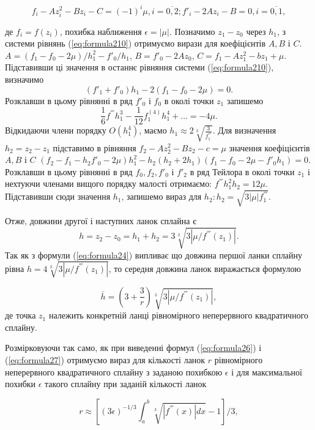 \documentclass[ukrainian,14pt]{extarticle}
\begin{document}
\begin{equation}\label{eq:formula210}
    f_i - Az^2_i - Bz_i - C = (-1)^i \mu, i = \overline{0,2}; f'_i - 2Az_i - B = 0, i = \overline{0, 1},
\end{equation}

де $f_i = f(z_i)$, похибка наближення $\epsilon = |\mu|$. Позначимо $z_1 - z_0$ через $h_1$, з системи рівнянь (\ref{eq:formula210}) отримуємо вирази для коефіцієнтів $A, B$ і $C$. $A = (f_1 - f_0 - 2\mu) / h_1^2 - f'_0 / h_1$, $B=f'_0 - 2Az_0$, $C = f_1 - Az_1^2 - bz_1 + \mu$. Підставивши ці значення в останнє рівняння системи (\ref{eq:formula210}), визначимо
$$(f'_1 + f'_0) h_1 - 2(f_1 - f_0 -2\mu) = 0.$$
Розклавши в цьому рівнянні в ряд $f'_0$ і $f_0$ в околі точки $z_1$ запишемо
$$\frac{1}{6}f^{'''}h^3_1 - \frac{1}{12} f_1^{(4)}h_1^4 + \ldots = -4\mu.$$
Відкидаючи члени порядку $O(h_1^4)$, маємо $h_1 \approx 2 \sqrt[3]{\frac{3}{f^{'''}_1}}$. Для визначення $h_2 = z_2 - z_1$ підставимо в рівняння $f_2 - Az_2^2 - Bz_2 - c = \mu$ значення коефіцієнтів $A, B$ і $C$
$(f_2 - f_1 - h_2 f'_0 - 2\mu) h_1^2 - h_2(h_2 + 2h_1)(f_1 - f_0 - 2\mu - f'_0h_1) = 0.$
Розклавши в цьому рівнянні в ряд $f_0, f_2, f'_0$ і $f'_2$ в ряд Тейлора в околі точки $z_1$ і нехтуючи членами вищого порядку малості отримаємо: $f^{'''}h^2_1 h_2 = 12\mu$. Підставивши сюди значення $h_1$, запишемо вираз для $h_2: h_2 = \sqrt{3 |\mu| f^{'''}_1}$.

Отже, довжини другої і наступних ланок сплайна є
$$h = z_2 - z_0 = h_1 + h_2 = 3 \sqrt[3]{3 |\mu / f^{'''}(z_1)|}.$$ Так як з формули (\ref{eq:formula24}) випливає що довжина першої ланки сплайну рівна $h = 4\sqrt[3]{3 |\mu / f^{'''}(z_1)|}$, то середня довжина ланок виражається формулою

\begin{equation}\label{eq:formula211}
    \bar{h} = \left(3 + \frac{3}{r}\right) \sqrt[3]{3 |\mu / f^{'''}(z_1)|}, 
\end{equation}
де точка $z_1$ належить конкретній ланці рівномірного неперервного квадратичного сплайну.

Розмірковуючи так само, як при виведенні формул (\ref{eq:formula26}) і (\ref{eq:formula27}) отримуємо вираз для кількості ланок $r$ рівномірного неперервного квадратичного сплайну з заданою похибкою $\epsilon$ і для максимальної похибки $\epsilon$ такого сплайну при заданій кількості ланок

\begin{equation}\label{eq:formula212}
    r \approx \left[  (3\epsilon)^{-1/3} \int_a^b \sqrt[3]{|f^{'''}(x)| dx} - 1   \right] / 3 ,
\end{equation}
\end{document}
